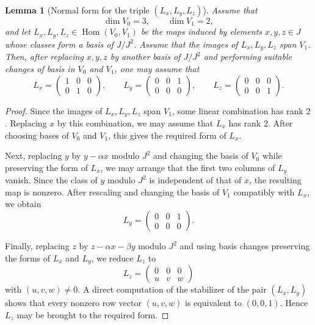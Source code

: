 \documentclass[11pt]{article}
\DeclareMathOperator{\Hom}{Hom}
\theoremstyle{plain}
\newtheorem{lemma}{Lemma}
\theoremstyle{remark}
\begin{document}
\begin{lemma}[Normal form for the triple $(L_x,L_y,L_z)$]
	Assume that
	\[
	\dim V_0=3,\qquad \dim V_1=2,
	\]
	and let $L_x,L_y,L_z\in \Hom(V_0,V_1)$ be the maps induced by elements
	$x,y,z\in J$ whose classes form a basis of $J/J^2$. Assume that the images of
	$L_x,L_y,L_z$ span $V_1$. Then, after replacing $x,y,z$ by another basis of
	$J/J^2$ and performing suitable changes of basis in $V_0$ and $V_1$, one may assume that
	\[
	L_x=
	\begin{pmatrix}
		1&0&0\\
		0&1&0
	\end{pmatrix},\qquad
	L_y=
	\begin{pmatrix}
		0&0&1\\
		0&0&0
	\end{pmatrix},\qquad
	L_z=
	\begin{pmatrix}
		0&0&0\\
		0&0&1
	\end{pmatrix}.
	\]
\end{lemma}

\begin{proof}
	Since the images of $L_x,L_y,L_z$ span $V_1$, some linear combination has rank $2$.
	Replacing $x$ by this combination, we may assume that $L_x$ has rank $2$. After choosing
	bases of $V_0$ and $V_1$, this gives the required form of $L_x$.
	
	Next, replacing $y$ by $y-\alpha x$ modulo $J^2$ and changing the basis of $V_0$ while preserving
	the form of $L_x$, we may arrange that the first two columns of $L_y$ vanish. Since the class of $y$
	modulo $J^2$ is independent of that of $x$, the resulting map is nonzero. After rescaling and changing
	the basis of $V_1$ compatibly with $L_x$, we obtain
	\[
	L_y=
	\begin{pmatrix}
		0&0&1\\
		0&0&0
	\end{pmatrix}.
	\]
	
	Finally, replacing $z$ by $z-\alpha x-\beta y$ modulo $J^2$ and using basis changes preserving the forms
	of $L_x$ and $L_y$, we reduce $L_z$ to
	\[
	L_z=
	\begin{pmatrix}
		0&0&0\\
		u&v&w
	\end{pmatrix}
	\]
	with $(u,v,w)\neq 0$. A direct computation of the stabilizer of the pair $(L_x,L_y)$ shows that every
	nonzero row vector $(u,v,w)$ is equivalent to $(0,0,1)$. Hence $L_z$ may be brought to the required form.
\end{proof}
\end{document}
